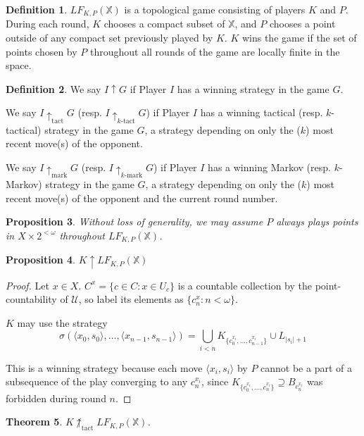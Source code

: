 \documentclass[11pt]{article}
\theoremstyle{plain}
\newtheorem{theorem}{Theorem}
\newtheorem{proposition}[theorem]{Proposition}
\theoremstyle{definition}
\newtheorem{definition}[theorem]{Definition}
\theoremstyle{remark}
\newcommand{\win}{\uparrow}
\newcommand{\markwin}{\uparrow_{\text{mark}}}
\newcommand{\tactwin}{\uparrow_{\text{tact}}}
\newcommand{\ktactwin}[1]{\uparrow_{#1\text{-tact}}}
\newcommand{\kmarkwin}[1]{\uparrow_{#1\text{-mark}}}
\newcommand{\lfkpgame}[1]{LF_{K,P}(#1)}
\newcommand{\<}{\langle}
\renewcommand{\>}{\rangle}
\begin{document}
\begin{definition}
$\lfkpgame{\mathbb{X}}$ is a topological game consisting of players $K$ and $P$. During each round, $K$ chooses a compact subset of $\mathbb{X}$, and $P$ chooses a point outside of any compact set previously played by $K$. $K$ wins the game if the set of points chosen by $P$ throughout all rounds of the game are locally finite in the space.
\end{definition}

\begin{definition}
We say $I \win G$ if Player $I$ has a winning strategy in the game $G$.

We say $I \tactwin G$ (resp. $I \ktactwin{k} G$) if Player $I$ has a winning tactical (resp. $k$-tactical) strategy in the game $G$, a strategy depending on only the ($k$) most recent move(s) of the opponent.

We say $I \markwin G$ (resp. $I \kmarkwin{k} G$) if Player $I$ has a winning Markov (resp. $k$-Markov) strategy in the game $G$, a strategy depending on only the ($k$) most recent move(s) of the opponent and the current round number.
\end{definition}

\begin{proposition}
Without loss of generality, we may assume $P$ always plays points in $X \times 2^{<\omega}$ throughout $\lfkpgame{\mathbb{X}}$.
\end{proposition}

\begin{proposition}
$K \win \lfkpgame{\mathbb{X}}$
\end{proposition}

\begin{proof}
Let $x\in X$. $C^x = \{c \in C : x \in U_c\}$ is a countable collection by the point-countability of $\mathcal{U}$, so label its elements as $\{c^x_n: n<\omega\}$.

$K$ may use the strategy 
  \[
    \sigma(\<x_0,s_0\>,\dots,\<x_{n-1},s_{n-1}\>) = 
    \bigcup_{i < n} K_{\{c^{x_i}_0,\dots,c^{x_i}_{n-1}\}} \cup L_{|s_i|+1}
  \]

This is a winning strategy because each move $\<x_i,s_i\>$ by $P$ cannot be a part of a subsequence of the play converging to any $c^{x_i}_n$, since $K_{\{c^{x_i}_0,\dots,c^{x_i}_n\}} \supseteq B_{c^{x_i}_n}$ was forbidden during round $n$.
\end{proof}

\begin{theorem}
$K\not\tactwin\lfkpgame{\mathbb{X}}$.
\end{theorem}
\end{document}
